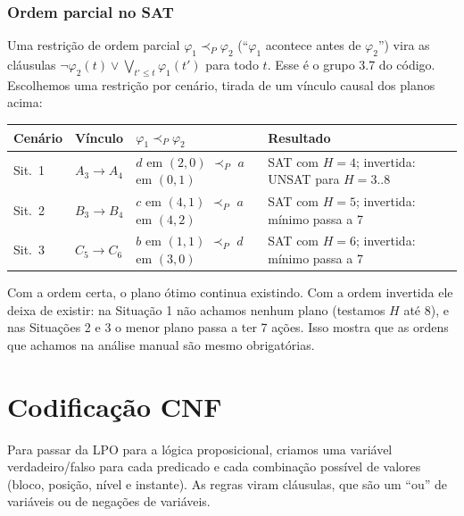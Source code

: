 \documentclass[11pt,a4paper]{article}
\begin{document}
\subsubsection{Ordem parcial no SAT}
Uma restrição de ordem parcial $\varphi_1\prec_P\varphi_2$
(``$\varphi_1$ acontece antes de $\varphi_2$'') vira as cláusulas
$\lnot\varphi_2(t)\lor\bigvee_{t'\le t}\varphi_1(t')$ para todo $t$. Esse é o grupo
3.7 do código. Escolhemos uma restrição por cenário, tirada de um vínculo causal dos
planos acima:
\begin{center}\small
\begin{tabular}{@{}llll@{}}
\toprule
Cenário & Vínculo & $\varphi_1\prec_P\varphi_2$ & Resultado\\
\midrule
Sit.~1 & $A_3\to A_4$ & $d$ em $(2,0)$ $\prec_P$ $a$ em $(0,1)$ &
  SAT com $H=4$; invertida: UNSAT para $H=3..8$\\
Sit.~2 & $B_3\to B_4$ & $c$ em $(4,1)$ $\prec_P$ $a$ em $(4,2)$ &
  SAT com $H=5$; invertida: mínimo passa a 7\\
Sit.~3 & $C_5\to C_6$ & $b$ em $(1,1)$ $\prec_P$ $d$ em $(3,0)$ &
  SAT com $H=6$; invertida: mínimo passa a 7\\
\bottomrule
\end{tabular}
\end{center}
Com a ordem certa, o plano ótimo continua existindo. Com a ordem invertida ele deixa
de existir: na Situação 1 não achamos nenhum plano (testamos $H$ até 8), e nas
Situações 2 e 3 o menor plano passa a ter 7 ações. Isso mostra que as ordens que
achamos na análise manual são mesmo obrigatórias.

\section{Codificação CNF}
\label{sec:cnf}
Para passar da LPO para a lógica proposicional, criamos uma variável
verdadeiro/falso para cada predicado e cada combinação possível de valores (bloco,
posição, nível e instante). As regras viram cláusulas, que são um ``ou'' de
variáveis ou de negações de variáveis.
\end{document}
